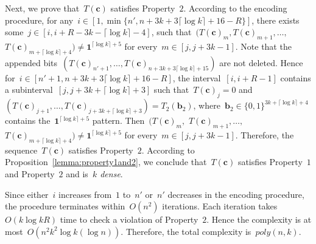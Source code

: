 \documentclass[10pt,a4paper,onecolumn]{IEEEtran}
\newcommand{\1}{\mathbbold{1}}
\newcommand{\boldb}{\mathbf{b}}
\newcommand{\boldc}{\mathbf{c}}
\begin{document}
Next, we prove that~$T(\boldc)$ satisfies Property~$2$. According to the encoding procedure, for any~$i\in [1,\min\{n',n+3k+3\lceil\log k\rceil+16-R\}]$, there exists some~$j\in[i,i+R-3k-\lceil \log k\rceil-4]$, such that~$(T(\boldc)_m,T(\boldc)_{m+1},\ldots,$ $T(\boldc)_{m+\lceil \log k \rceil +4})\ne\boldsymbol{1}^{\lceil \log k \rceil +5}$ for every~$m\in [j,j+3k-1]$.  
Note that the appended bits~$(T(\boldc)_{n'+1},\ldots,T(\boldc)_{n+3k+3\lceil\log k\rceil+15})$ are not deleted. Hence for~$i\in [n'+1,n+3k+3\lceil\log k\rceil+16-R]$, the interval~$[i,i+R-1]$ contains a subinterval~$[j,j+3k+\lceil\log k\rceil+3]$ such that~$T(\boldc)_{j}=0$ and~$(T(\boldc)_{j+1},\ldots,T(\boldc)_{j+3k+\lceil\log k\rceil+3})=T_2(\boldb_2)$, where~$\boldb_2\in\{0,1\}^{3k+\lceil\log k\rceil+4}$ contains the~$\boldsymbol{1}^{\lceil\log k\rceil+5}$ pattern. Then~$(T(\boldc)_m,$ $T(\boldc)_{m+1},\ldots,$ $T(\boldc)_{m+\lceil \log k \rceil +4})\ne\boldsymbol{1}^{\lceil \log k \rceil +5}$ for every~$m\in [j,j+3k-1]$. Therefore, the sequence~$T(\boldc)$ satisfies Property~$2$. According to Proposition~\ref{lemma:property1and2}, we conclude that~$T(\boldc)$ satisfies Property~$1$ and Property~$2$ and is~\emph{$k$ dense}. 


Since either~$i$ increases from~$1$ to~$n'$ or~$n'$ decreases in the encoding procedure, the procedure terminates within~$O(n^2)$ iterations. Each iteration takes~$O(k\log kR)$ time to check a violation of Property~$2$. Hence the complexity is at most~$O(n^2k^2\log k(\log n))$. Therefore, the total complexity is~$poly(n,k)$.
 
\end{document}
